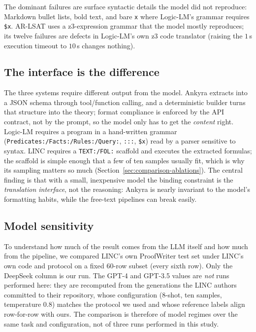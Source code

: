\documentclass[11pt,a4paper]{article}
\begin{document}
The dominant failures are surface syntactic details the model did not reproduce: Markdown
bullet lists, bold text, and bare \texttt{x} where Logic-LM's grammar requires \texttt{\$x}.
AR-LSAT uses a z3-expression grammar that the model mostly reproduces; its twelve failures
are defects in Logic-LM's own z3 code translator (raising the $1$\,s execution timeout to
$10$\,s changes nothing).

\subsection{The interface is the difference}
\label{sec:comparison-interface}

The three systems require different output from the model. Ankyra extracts into a JSON
schema through tool/function calling, and a deterministic builder turns that structure into
the theory; format compliance is enforced by the API contract, not by the prompt, so the
model only has to get the \emph{content} right. Logic-LM requires a program in a hand-written
grammar (\texttt{Predicates:/Facts:/Rules:/Query:}, \texttt{:::}, \texttt{\$x}) read by a
parser sensitive to syntax. LINC requires a \texttt{TEXT:/FOL:} scaffold and executes the
extracted formulas; the scaffold is simple enough that a few of ten samples usually fit,
which is why its sampling matters so much (Section~\ref{sec:comparison-ablations}). The
central finding is that with a small, inexpensive model the binding constraint is the
\emph{translation interface}, not the reasoning: Ankyra is nearly invariant to the model's
formatting habits, while the free-text pipelines can break easily.

\subsection{Model sensitivity}
\label{sec:comparison-model}

To understand how much of the result comes from the LLM itself and how much from the
pipeline, we compared LINC's own ProofWriter test set under LINC's own code and protocol on
a fixed 60-row subset (every sixth row). Only the DeepSeek column is our run. The GPT-4 and
GPT-3.5 values are \emph{not} runs performed here: they are recomputed from the generations
the LINC authors committed to their repository, whose configuration (8-shot, ten samples,
temperature 0.8) matches the protocol we used and whose reference labels align row-for-row
with ours. The comparison is therefore of model regimes over the same task and
configuration, not of three runs performed in this study.
\end{document}
